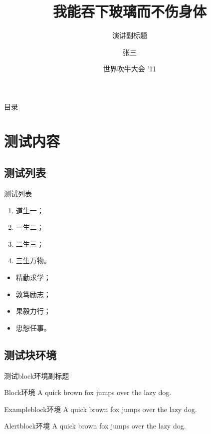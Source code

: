 \documentclass{ctexbeamer}
\title{我能吞下玻璃而不伤身体}
\subtitle{演讲副标题} %
\author{张三} %
\institute[Xi'an Jiaotong University] %
{
  西安交通大学
}
\date[Short Occasion] %
{世界吹牛大会 '11}
\begin{document}
\begin{frame}
  \titlepage
\end{frame}

\begin{frame}{目录}
  \tableofcontents %
\end{frame}

\section{测试内容}
\subsection{测试列表}

\begin{frame}{测试列表}
  \begin{enumerate}
    \item 道生一；
    \item 一生二；
    \item 二生三；
    \item 三生万物。
  \end{enumerate}

  \begin{itemize}
    \item 精勤求学；
    \item 敦笃励志；
    \item 果毅力行；
    \item 忠恕任事。
  \end{itemize}
\end{frame}

\subsection{测试块环境}

\begin{frame}{测试block环境}{副标题}
    \begin{block}{Block环境}
        A quick brown fox jumps over the lazy dog.
    \end{block} \pause

    \begin{exampleblock}{Exampleblock环境}
        A quick brown fox jumps over the lazy dog.
    \end{exampleblock} \pause

    \begin{alertblock}{Alertblock环境}
        A quick brown fox jumps over the lazy dog.
    \end{alertblock} 
\end{frame}
\end{document}
